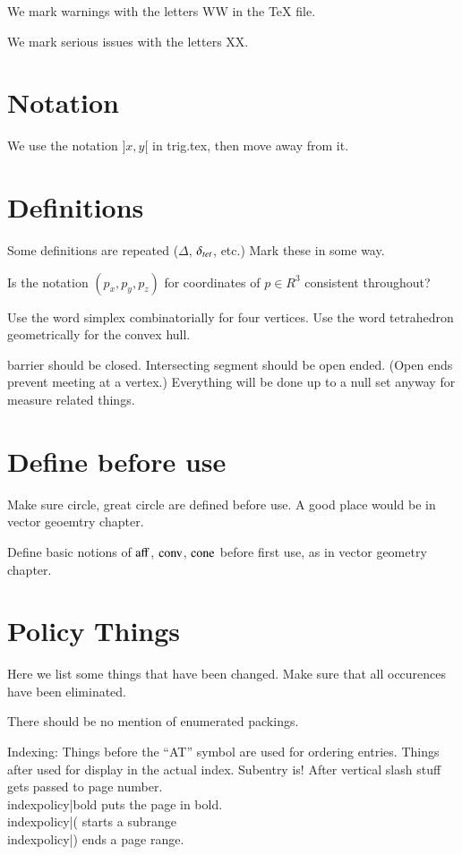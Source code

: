 

We mark warnings with the letters WW in 
the TeX file.

We mark serious issues with the letters XX.

\section{Notation}

We use the notation $]x,y[$ in trig.tex, then move away from it.

\section{Definitions}

Some definitions are repeated ($\Delta$, $\delta_{tet}$, etc.)
Mark these in some way.

Is the notation $(p_x,p_y,p_z)$ for coordinates 
of $p\in R^3$ consistent throughout?

Use the word simplex combinatorially for four vertices.
Use the word tetrahedron geometrically for the convex hull.

barrier should be closed. Intersecting segment should be open ended.
(Open ends prevent meeting at a vertex.)
Everything will be done up to a null set
anyway for measure related things.

\section{Define before use}

Make sure circle, great circle are defined before use.
A good place would be in vector geoemtry chapter.

Define basic notions of ${\operatorname{aff}}$, ${\operatorname{conv}}$, ${\operatorname{cone}}$
before first use, as in vector geometry chapter.


\section{Policy Things}

Here we list some things that have been changed.  Make sure that
all occurences have been eliminated.

There should be no mention of enumerated packings.

Indexing: Things before the ``AT'' symbol are used for ordering entries.
Things after used for display in the actual index.
Subentry is!  After vertical slash stuff gets passed to page
number.  \\index{policy|bold}  puts the page in bold.
\\index{policy|(} starts a subrange \\index{policy|)} ends a page range.

